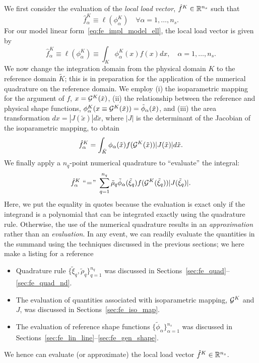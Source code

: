 We first consider the evaluation of the \emph{local load vector}, $\hat f^K \in \mathbb{R}^{n_s}$ such that
\begin{equation*}
  \hat f^K_\alpha \equiv \ell(\phi^K_\alpha) \quad \forall \alpha = 1,\dots,n_s.
\end{equation*}
For our model linear form~\eqref{eq:fe_impl_model_ell}, the local load vector is given by
\begin{equation*}
  \hat f^K_\alpha
  \equiv \ell(\phi^K_\alpha) \equiv \int_K \phi^K_\alpha(x) f(x) dx , \quad \alpha = 1,\dots, n_s.
\end{equation*}
We now change the integration domain from the physical domain $K$ to the reference domain $\tilde K$; this is in preparation for the application of the numerical quadrature on the reference domain.  We employ (i) the isoparametric mapping for the argument of $f$, $x = \mathcal{G}^K(\tilde x)$, (ii) the relationship between the reference and physical shape functions, $\phi^K_\alpha(x \equiv \mathcal{G}^K(\tilde x)) = \tilde \phi_\alpha(\tilde x)$, and (iii) the area transformation $dx = |J(\tilde x)| d \tilde x$, where $|J|$ is the determinant of the Jacobian of the isoparametric mapping, to obtain 
\begin{equation}
  \hat f^K_\alpha
  = \int_{\tilde K} \phi_\alpha(\tilde x) f(\mathcal{G}^K(\tilde x)) |J(\tilde x)| d \tilde x .
  \label{eq:fe_impl_loc_vec_2}
\end{equation}
We finally apply a $n_q$-point numerical quadrature to ``evaluate'' the integral:
\begin{equation*}
    \hat f^K_\alpha \
    \text{``}\hspace{-0.2em}=\hspace{-0.2em}\text{''}
    \ \sum_{q=1}^{n_q} \tilde \rho_q \tilde \phi_\alpha(\tilde \xi_q) f(\mathcal{G}^K(\tilde \xi_q)) |J(\tilde \xi_q)| .
\end{equation*}
Here, we put the equality in quotes because the evaluation is exact only if the integrand is a polynomial that can be integrated exactly using the quadrature rule.  Otherwise, the use of the numerical quadrature results in an \emph{approximation} rather than an \emph{evaluation}. In any event, we can readily evaluate the quantities in the summand using the techniques discussed in the previous sections; we here make a listing for a reference
\begin{itemize}
\item Quadrature rule $\{\tilde \xi_q, \tilde \rho_q\}_{q=1}^{n_q}$ was discussed in Sections~\ref{sec:fe_quad}--\ref{sec:fe_quad_nd}.
\item The evaluation of quantities associated with isoparametric mapping, $\mathcal{G}^K$ and $J$, was discussed in Sections~\ref{sec:fe_iso_map}.
\item The evaluation of reference shape functions $\{\tilde \phi_\alpha \}_{\alpha=1}^{n_s}$ was discussed in Sections~\ref{sec:fe_lin_line}--\ref{sec:fe_gen_shape}.
\end{itemize}
We hence can evaluate (or approximate) the local load vector $\hat f^K \in \mathbb{R}^{n_s}$.

